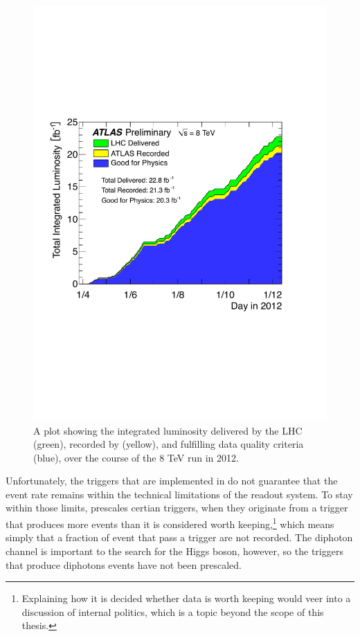 \begin{figure}[htp]
\begin{minipage}[b]{.57\textwidth}
\hspace{-1em}\includegraphics[width=\textwidth]{figures/intlumi}
\end{minipage}\hfill\begin{minipage}[b]{.4\textwidth}
\caption{A plot \cite{publiclumi} showing the integrated luminosity delivered by the LHC (green), recorded by \atlas{} (yellow), and fulfilling data quality criteria (blue), over the course of the 8 TeV run in 2012.
\label{intlumi}}
\end{minipage}
\end{figure}

Unfortunately, the triggers that are implemented in \atlas{} do not guarantee that the event rate remains within the technical limitations of the readout system. To stay within those limits, \atlas{} prescales certian triggers, when they originate from a trigger that produces more events than it is considered worth keeping,\footnote{Explaining how it is decided whether data is worth keeping would veer into a discussion of \atlas{} internal politics, which is a topic beyond the scope of this thesis.} which means simply that a fraction of event that pass a trigger are not recorded. The diphoton channel is important to the search for the Higgs boson, however, so the triggers that produce diphotons events have not been prescaled.
